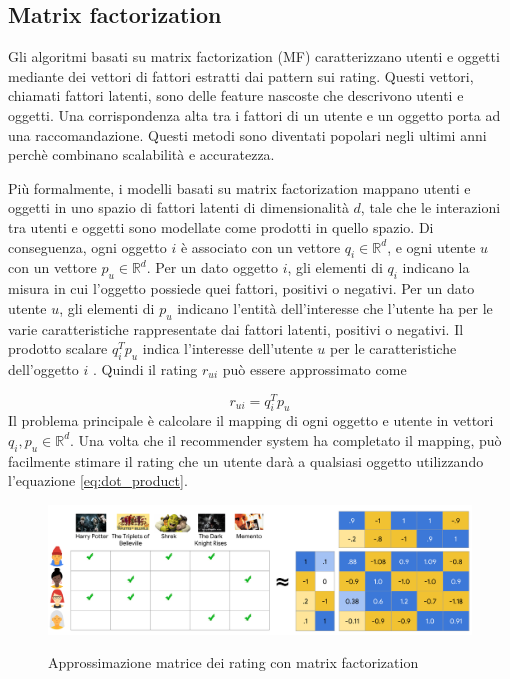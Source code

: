 \subsection{Matrix factorization} \label{ssec:mf}
Gli algoritmi basati su matrix factorization (MF) caratterizzano utenti e oggetti mediante dei vettori di fattori estratti dai pattern sui rating. Questi vettori, chiamati fattori latenti, sono delle feature nascoste che descrivono utenti e oggetti. Una corrispondenza alta tra i fattori di un utente e un oggetto porta ad una raccomandazione. Questi metodi sono diventati popolari negli ultimi anni perchè combinano scalabilità e accuratezza. %

Più formalmente, i modelli basati su matrix factorization mappano utenti e oggetti in uno spazio di fattori latenti di dimensionalità $d$, tale che le interazioni tra utenti e oggetti sono modellate come prodotti in quello spazio. Di conseguenza, ogni oggetto $i$ è associato con un vettore $q_i \in \mathbb{R}^d$, e ogni utente $u$ con un vettore $p_u \in \mathbb{R}^d$. Per un dato oggetto $i$, gli elementi di $q_i$ indicano la misura in cui l'oggetto possiede quei fattori, positivi o negativi. Per un dato utente $u$, gli elementi di $p_u$ indicano l'entità dell'interesse che l'utente ha per le varie caratteristiche rappresentate dai fattori latenti, positivi o negativi. Il prodotto scalare $q_i^Tp_u$ indica l'interesse dell'utente $u$ per le caratteristiche dell'oggetto $i$ \cite{matrix-factorization}. Quindi il rating $r_{ui}$ può essere approssimato come

\begin{equation} \label{eq:dot_product}
r_{ui} = q_i^Tp_u
\end{equation}
Il problema principale è calcolare il mapping di ogni oggetto e utente in vettori $q_i, p_u \in \mathbb{R}^d$. Una volta che il recommender system ha completato il mapping, può facilmente stimare il rating che un utente darà a qualsiasi oggetto utilizzando l'equazione \ref{eq:dot_product}. 

\begin{figure}
  \centering
  \includegraphics[width=\linewidth]{immagini/matrix_factorization.pdf}
  \caption{Approssimazione matrice dei rating con matrix factorization}
  \cite{mf-google}
  \label{fig:matrix_factorization}
\end{figure}

